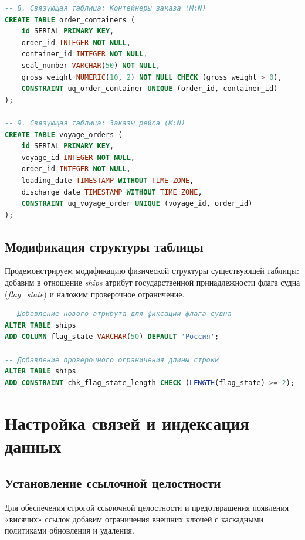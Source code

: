 \documentclass[a4paper,14pt]{article}
\begin{document}
\begin{lstlisting}[language=SQL]
-- 8. Связующая таблица: Контейнеры заказа (M:N)
CREATE TABLE order_containers (
    id SERIAL PRIMARY KEY,
    order_id INTEGER NOT NULL,
    container_id INTEGER NOT NULL,
    seal_number VARCHAR(50) NOT NULL,
    gross_weight NUMERIC(10, 2) NOT NULL CHECK (gross_weight > 0),
    CONSTRAINT uq_order_container UNIQUE (order_id, container_id)
);

-- 9. Связующая таблица: Заказы рейса (M:N)
CREATE TABLE voyage_orders (
    id SERIAL PRIMARY KEY,
    voyage_id INTEGER NOT NULL,
    order_id INTEGER NOT NULL,
    loading_date TIMESTAMP WITHOUT TIME ZONE,
    discharge_date TIMESTAMP WITHOUT TIME ZONE,
    CONSTRAINT uq_voyage_order UNIQUE (voyage_id, order_id)
);
\end{lstlisting}

\subsection{Модификация структуры таблицы}
Продемонстрируем модификацию физической структуры существующей таблицы: добавим в отношение \textit{ships} атрибут государственной принадлежности флага судна (\textit{flag\_state}) и наложим проверочное ограничение.

\begin{lstlisting}[language=SQL]
-- Добавление нового атрибута для фиксации флага судна
ALTER TABLE ships 
ADD COLUMN flag_state VARCHAR(50) DEFAULT 'Россия';

-- Добавление проверочного ограничения длины строки
ALTER TABLE ships 
ADD CONSTRAINT chk_flag_state_length CHECK (LENGTH(flag_state) >= 2);
\end{lstlisting}

\newpage
\section{Настройка связей и индексация данных}

\subsection{Установление ссылочной целостности}
Для обеспечения строгой ссылочной целостности и предотвращения появления «висячих» ссылок добавим ограничения внешних ключей с каскадными политиками обновления и удаления.
\end{document}

